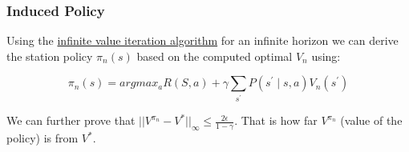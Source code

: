 \documentclass[12pt]{article}
\begin{document}
            \subsubsection{Induced Policy}
                Using the \hyperref[InfiniteValIterAlgo]{infinite value iteration algorithm} for an infinite horizon we
                can derive the station policy $\pi_n(s)$ based on the computed optimal $V_n$ using:

                $$ \pi_n(s) = argmax_a R(S,a) + \gamma \sum_{s^{\prime}} P(s^{\prime} \mid s, a) V_n(s^{\prime}) $$

                We can further prove that $||V^{\pi_n} - V^*||_{\infty} \leq \frac{2 \epsilon}{1-\gamma}$. That is how
                far $V^{\pi_n}$ (value of the policy) is from $V^*$. 
           
\printindex
\end{document}
